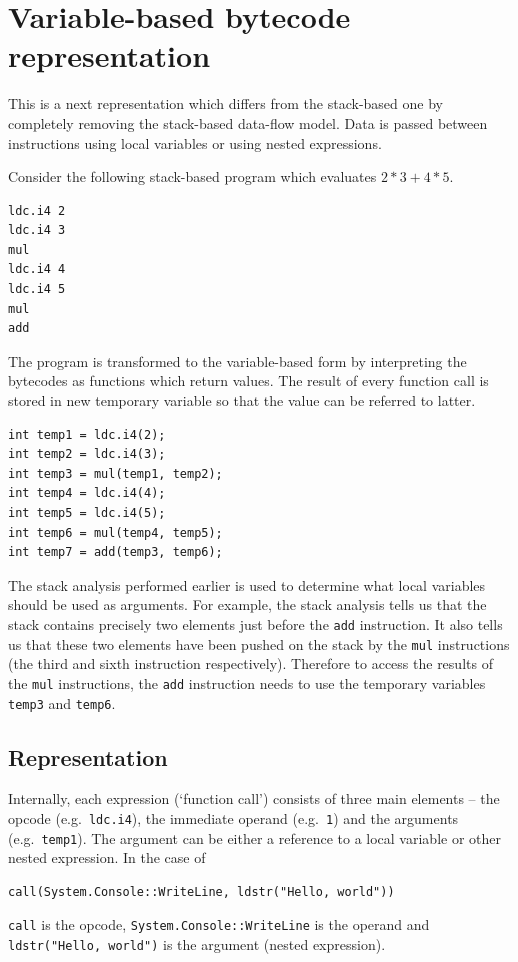 \documentclass[12pt,twoside,notitlepage]{report}
\begin{document}
\section{Variable-based bytecode representation}
  \label{Variable-based bytecode representation}

This is a next representation which differs from the stack-based
one by completely removing the stack-based data-flow model.
Data is passed between instructions using local variables
or using nested expressions.

Consider the following stack-based program which evaluates
$2 * 3 + 4 * 5$.
\begin{verbatim}
ldc.i4 2
ldc.i4 3
mul
ldc.i4 4
ldc.i4 5
mul
add
\end{verbatim}

The program is transformed to the variable-based form by
interpreting the bytecodes as functions which return values.
The result of every function call is stored in new temporary
variable so that the value can be referred to latter.

\begin{verbatim}
int temp1 = ldc.i4(2);
int temp2 = ldc.i4(3);
int temp3 = mul(temp1, temp2);
int temp4 = ldc.i4(4);
int temp5 = ldc.i4(5);
int temp6 = mul(temp4, temp5);
int temp7 = add(temp3, temp6);
\end{verbatim}

The stack analysis performed earlier is used to determine
what local variables should be used as arguments.
For example, the stack analysis tells us that the stack contains
precisely two elements just before the \verb|add| instruction.
It also tells us that these two elements have been pushed on the stack by the
\verb|mul| instructions (the third and sixth instruction respectively).
Therefore to access the results of the \verb|mul| instructions,
the \verb|add| instruction needs to use the temporary variables 
\verb|temp3| and \verb|temp6|.

\subsection{Representation}

Internally, each expression (`function call') consists of three 
main elements -- the opcode (e.g.\ \verb|ldc.i4|), the immediate operand
(e.g.\ \verb|1|) and the arguments (e.g.\ \verb|temp1|).
The argument can be either a reference to a local variable or 
other nested expression. In the case of
\begin{verbatim}
call(System.Console::WriteLine, ldstr("Hello, world"))
\end{verbatim}
\verb|call| is the opcode, 
\verb|System.Console::WriteLine| is the operand and
\verb|ldstr("Hello, world")| is the argument (nested expression).
\end{document}
